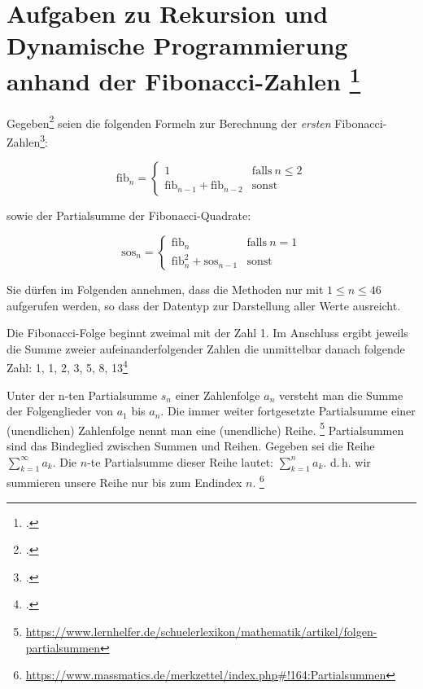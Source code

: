 \documentclass{lehramt-informatik-aufgabe}
\begin{document}

\section{Aufgaben zu Rekursion und Dynamische Programmierung anhand der
Fibonacci-Zahlen
\footcite[Seite 1]{aud:pu:3}}

Gegeben\footcite[Thema 1 Aufgabe 3 Seite 5]{examen:66115:2017:03} seien die folgenden Formeln zur
Berechnung der \emph{ersten}
Fibonacci-Zahlen\footcite{wiki:fibonacci-folge}:

\begin{equation*}
\text{fib}_n =
\begin{cases}
1 & \text{falls}\ n \leq 2\\
\text{fib}_{n-1} + \text{fib}_{n-2} & \text{sonst}
\end{cases}
\end{equation*}

sowie der Partialsumme der Fibonacci-Quadrate:

\begin{equation*}
\text{sos}_n =
\begin{cases}
\text{fib}_n & \text{falls}\ n = 1\\
\text{fib}_n^2 + \text{sos}_{n-1} & \text{sonst}
\end{cases}
\end{equation*}

\noindent
Sie dürfen im Folgenden annehmen, dass die Methoden nur mit $1 \leq n
\leq 46$ aufgerufen werden, so dass der Datentyp  zur
Darstellung aller Werte ausreicht.

\begin{exkurs}
Die Fibonacci-Folge beginnt zweimal mit der Zahl 1.
Im Anschluss ergibt jeweils die Summe zweier aufeinanderfolgender Zahlen
die unmittelbar danach folgende Zahl: 1, 1, 2, 3, 5, 8, 13\footcite{wiki:fibonacci-folge}
\end{exkurs}

\begin{exkurs}[Partialsumme]
Unter der n-ten Partialsumme $s_n$ einer Zahlenfolge $a_n$ versteht man
die Summe der Folgenglieder von $a_1$ bis $a_n$. Die immer
weiter fortgesetzte Partialsumme einer (unendlichen) Zahlenfolge nennt
man eine (unendliche) Reihe.
\footnote{\url{https://www.lernhelfer.de/schuelerlexikon/mathematik/artikel/folgen-partialsummen}}
Partialsummen sind das Bindeglied zwischen Summen und Reihen.
Gegeben sei die Reihe $\sum_{k = 1}^{\infty} a_k$.
Die $n$-te Partialsumme dieser Reihe lautet: $\sum_{k = 1}^{n} a_k$.
d.\,h. wir summieren unsere Reihe nur bis zum Endindex $n$.
\footnote{\url{https://www.massmatics.de/merkzettel/index.php\#!164:Partialsummen}}
\end{exkurs}
\end{document}
